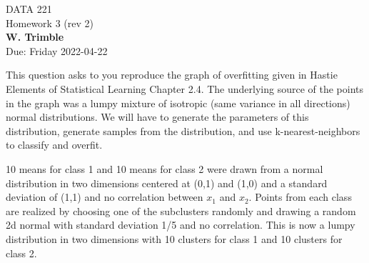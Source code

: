 \documentclass[12pt]{book}
\theoremstyle{definition}
\begin{document}
\begin{center}
{\Large DATA 221 \\  Homework 3  (rev 2)}\\
\textbf{W. Trimble}\\ %
Due: Friday 2022-04-22 
\end{center}

\vspace{0.2 cm}

This question asks to you reproduce the graph of overfitting given in Hastie Elements of Statistical Learning Chapter 2.4.  The underlying source of the points in the graph was a lumpy mixture of isotropic (same variance in all directions) normal distributions.  We will have to generate the parameters of this distribution, generate samples from the distribution, and use k-nearest-neighbors to classify and overfit.

10 means for class 1 and 10 means for class 2 were drawn from a normal distribution in two dimensions centered at (0,1) and (1,0) and a standard deviation of (1,1) and no correlation between $x_1$ and $x_2$.   Points from each class are realized by choosing one of the subclusters randomly and drawing a random 2d normal with standard deviation 1/5 and no correlation.  This is now a lumpy distribution in two dimensions with 10 clusters for class 1 and 10 clusters for class 2.
\end{document}
